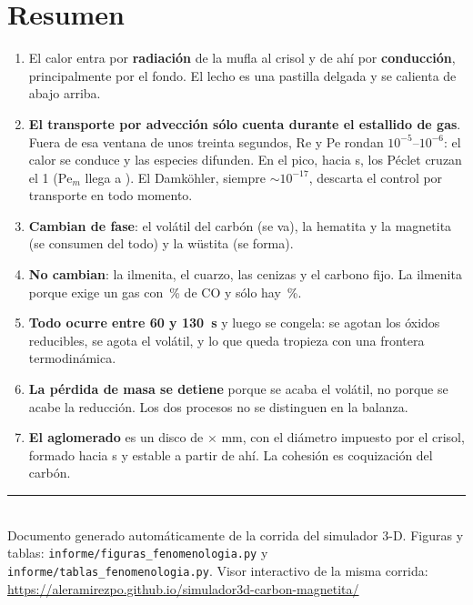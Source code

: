 \documentclass[11pt,a4paper]{article}
\begin{document}
\section{Resumen}

\begin{enumerate}[leftmargin=*]
  \item El calor entra por \textbf{radiación} de la mufla al crisol y de ahí por
        \textbf{conducción}, principalmente por el fondo. El lecho es una
        pastilla delgada y se calienta de abajo arriba.
  \item \textbf{El transporte por advección sólo cuenta durante el estallido de
        gas}. Fuera de esa ventana de unos treinta segundos, Re y Pe rondan
        $10^{-5}$--$10^{-6}$: el calor se conduce y las especies difunden. En el
        pico, hacia \datTPico{} \si{\second}, los Péclet cruzan el 1
        ($\mathrm{Pe}_m$ llega a \datPeMasicoMax{}). El Damköhler, siempre
        $\sim10^{-17}$, descarta el control por transporte en todo momento.
  \item \textbf{Cambian de fase}: el volátil del carbón (se va), la hematita y
        la magnetita (se consumen del todo) y la wüstita (se forma).
  \item \textbf{No cambian}: la ilmenita, el cuarzo, las cenizas y el carbono
        fijo. La ilmenita porque exige un gas con
        \datUmbralIlmenita{}\,\% de CO y sólo hay
        \datGas{}\,\%.
  \item \textbf{Todo ocurre entre \SI{60}{} y \SI{130}{\second}} y luego se
        congela: se agotan los óxidos reducibles, se agota el volátil, y lo que
        queda tropieza con una frontera termodinámica.
  \item \textbf{La pérdida de masa se detiene} porque se acaba el volátil, no
        porque se acabe la reducción. Los dos procesos no se distinguen en la
        balanza.
  \item \textbf{El aglomerado} es un disco de
        \datDiametro{} $\times$
        \datAltura{} \si{\milli\meter}, con el diámetro
        impuesto por el crisol, formado hacia
        \datTFormacion{} \si{\second} y estable a partir de
        ahí. La cohesión es coquización del carbón.
\end{enumerate}

\vfill
\noindent\rule{\linewidth}{0.4pt}\\
\small
Documento generado automáticamente de la corrida del simulador 3-D. Figuras y
tablas: \texttt{informe/figuras\_fenomenologia.py} y
\texttt{informe/tablas\_fenomenologia.py}. Visor interactivo de la misma
corrida: \url{https://aleramirezpo.github.io/simulador3d-carbon-magnetita/}
\end{document}
